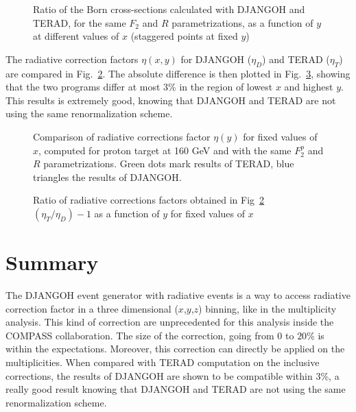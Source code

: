 \begin{figure}[!htb]
\centerline{}
\caption{Ratio of the Born cross-sections calculated with DJANGOH and TERAD, for the same $F_2$ and $R$ parametrizations, as a function of $y$ at different values of $x$ (staggered points at fixed $y$)}\label{fig:BRy}
\end{figure}

The radiative correction factors $\eta(x,y)$ for DJANGOH ($\eta_D$) and TERAD ($\eta_T$) are compared in Fig.~\ref{fig:RCy}. The absolute difference is then plotted in Fig.~\ref{fig:ERy}, showing that the two programs differ at most $3$\% in the region of lowest $x$ and highest $y$. This results is extremely good, knowing that DJANGOH and TERAD are not using the same renormalization scheme.


\begin{figure}[htb]
\centerline{}
\caption{Comparison of radiative corrections factor $\eta(y)$ for fixed values of $x$, computed for proton target at 160 GeV and with the same $F^p_2$ and $R$ parametrizations. Green dots mark results of TERAD, blue triangles the results of DJANGOH.}\label{fig:RCy}
\end{figure}

\begin{figure}[htb]
\centerline{}
\caption{Ratio of radiative corrections factors obtained in Fig~\ref{fig:RCy} $(\eta_T/\eta_D)-1$ as a function of $y$ for fixed values of $x$}\label{fig:ERy}
\end{figure}

\newpage


\section{Summary}

The DJANGOH event generator with radiative events is a way to access radiative correction factor in a three dimensional ($x$,$y$,$z$) binning, like in the multiplicity analysis. This kind of correction are unprecedented for this analysis inside the COMPASS collaboration. The size of the correction, going from $0$ to $20$\% is within the expectations. Moreover, this correction can directly be applied on the multiplicities. When compared with TERAD computation on the inclusive corrections, the results of DJANGOH are shown to be compatible within $3$\%, a really good result knowing that DJANGOH and TERAD are not using the same renormalization scheme.
